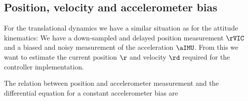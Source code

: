 \subsection{Position, velocity and accelerometer bias}
For the translational dynamics we have a similar situation as for the attitude kinematics:
We have a down-sampled and delayed position measurement $\rVIC$ and a biased and noisy measurement of the acceleration $\aIMU$.
From this we want to estimate the current position $\r$ and velocity $\rd$ required for the controller implementation.

The relation between position and accelerometer measurement and the differential equation for a constant accelerometer bias are
